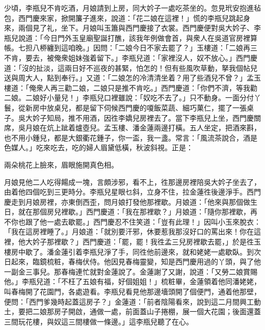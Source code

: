 少頃，李瓶兒不肯吃酒，月娘請到上房，同大妗子一處吃茶坐的。忽見玳安抱進毡包，西門慶來家，掀開簾子進來，說道：「花二娘在這裡！」慌的李瓶兒跳起身來，兩個見了礼，坐下。月娘叫玉簫與西門慶接了衣裳。西門慶便對吳大妗子、李瓶兒說道：「今日門外玉皇廟聖誕打醮，該我年例做會首，與衆人在吳道官房裡算帳。七担八桺纏到這咱晚。」因問：「二娘今日不家去罷了？」玉樓道：「二娘再三不肯，要去，被俺衆姐妹強着留下。」李瓶兒道：「家裡沒人，奴不放心。」西門慶道：「沒的扯淡，這兩日好不巡夜的甚緊，怕怎的！但有些風吹草動，拏我個帖兒送與周大人，點到奉行。」又道：「二娘怎的冷清清坐着？{}{}用了些酒兒不曾？」孟玉樓道：「俺衆人再三勸二娘，二娘只是推不肯吃。」西門慶道：「你們不濟，等我勸二娘。二娘好小量兒！」{}李瓶兒口裡雖說：「奴吃不去了。」只不動身。一面分付丫鬟，從新房中放桌兒，都是留下伺候西門慶的嗄飯菜蔬、細巧菓仁，擺了一張桌子。吳大妗子知局，推不用酒，因徃李嬌兒房裡去了。{}當下李瓶兒上坐，西門慶關席，吳月娘在炕上跐着爐壺兒。{}孟玉樓、潘金蓮兩邊打橫。五人坐定，把酒來斟，也不用小鍾兒，都是大銀衢花鍾子，你一盃，我一盞。常言：「風流茶說合，酒是色媒人。」吃來吃去，吃的婦人眉黛低橫，秋波斜視。{}正是：

\begin{myquote}
兩朵桃花上臉來，眉眼施開真色相。
\end{myquote}

月娘見他二人吃得餳成一塊，言頗涉邪，看不上，{}徃那邊房裡陪吳大妗子坐去了，由着他四個吃到三更時分。李瓶兒星眼乜斜，立身不住，拉金蓮徃後邊淨手。西門慶走到月娘房裡，亦東倒西歪，問月娘打發他那裡歇。月娘道：「他來與那個做生日，就在那個房兒裡歇。」西門慶道：「我在那裡歇？」{}月娘道：「隨你那裡歇，再不你也跟了他一處去歇罷。」西門慶忍不住笑道：「豈有此理！」因叫小玉來脫衣：「我在這房裡睡了。」{}月娘道：「就別要汗邪，休要惹我那沒好口的罵出來！你在這裡，他大妗子那裡歇？」西門慶道：「罷，罷！{}我徃孟三兒房裡歇去罷，」於是徃玉樓房中歇了。潘金蓮引着李瓶兒淨了手，同徃他前邊來，就和姥姥一處歇臥。到次日起來，臨鏡梳粧，春梅伏侍。他因見春梅靈變，知是西門慶用過的丫頭，與了他一副金三事兒。{}那春梅連忙就對金蓮說了。金蓮謝了又謝，說道：「又勞二娘賞賜他。」李瓶兒道：「不枉了五娘有福，好個姐姐！」梳粧畢，金蓮領着他同潘姥姥，叫春梅開了花園門，各處遊看。李瓶兒看見他那邊墻頭開了個便門，通着他那壁，便問：「西門爹幾時起蓋這房子？」金蓮道：「前者陰陽看來，說到這二月間興工動土，要把二娘那房子開啟，通做一處，前面蓋山子捲棚，展一個大花園；後面還蓋三間玩花樓，與奴這三間樓做一條邊。」這李瓶兒聽了在心。

